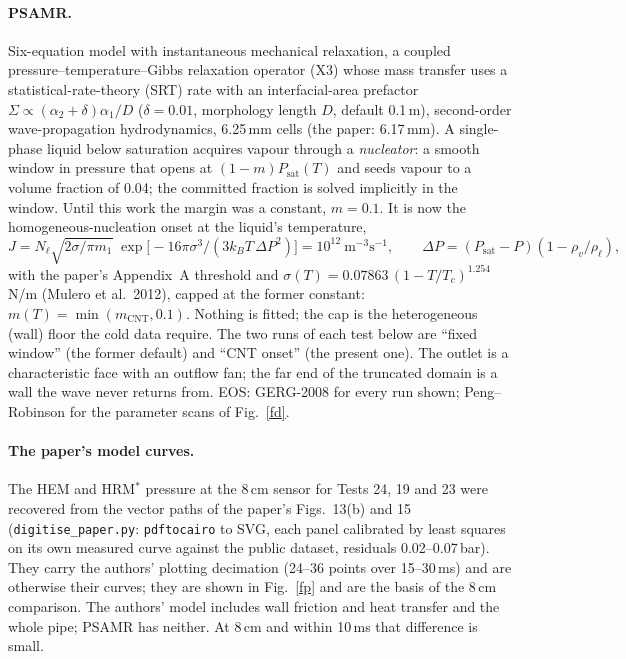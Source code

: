 \documentclass[11pt,a4paper]{article}
\begin{document}
\paragraph{PSAMR.} Six-equation model with instantaneous mechanical relaxation, a coupled pressure--temperature--Gibbs relaxation operator (X3) whose mass transfer uses a statistical-rate-theory (SRT) rate with an interfacial-area prefactor $\Sigma \propto (\alpha_2+\delta)\alpha_1/D$ ($\delta = 0.01$, morphology length $D$, default 0.1\,m), second-order wave-propagation hydrodynamics, 6.25\,mm cells (the paper: 6.17\,mm). A single-phase liquid below saturation acquires vapour through a \emph{nucleator}: a smooth window in pressure that opens at $(1 - m)P_{\mathrm{sat}}(T)$ and seeds vapour to a volume fraction of 0.04; the committed fraction is solved implicitly in the window. Until this work the margin was a constant, $m = 0.1$. It is now the homogeneous-nucleation onset at the liquid's temperature,
\[ J = N_\ell\sqrt{2\sigma/\pi m_1}\;\exp\!\big[-16\pi\sigma^3/(3k_BT\,\Delta P^2)\big] = 10^{12}\ \mathrm{m^{-3}s^{-1}},\qquad \Delta P = (P_{\mathrm{sat}} - P)(1 - \rho_v/\rho_\ell), \]
with the paper's Appendix~A threshold and $\sigma(T) = 0.07863\,(1 - T/T_c)^{1.254}$\,N/m (Mulero et al.\ 2012), capped at the former constant: $m(T) = \min(m_{\mathrm{CNT}}, 0.1)$. Nothing is fitted; the cap is the heterogeneous (wall) floor the cold data require. The two runs of each test below are ``fixed window'' (the former default) and ``CNT onset'' (the present one). The outlet is a characteristic face with an outflow fan; the far end of the truncated domain is a wall the wave never returns from. EOS: GERG-2008 for every run shown; Peng--Robinson for the parameter scans of Fig.~\ref{fd}.

\paragraph{The paper's model curves.} The HEM and HRM$^*$ pressure at the 8\,cm sensor for Tests 24, 19 and 23 were recovered from the vector paths of the paper's Figs.~13(b) and 15 (\texttt{digitise\_paper.py}: \texttt{pdftocairo} to SVG, each panel calibrated by least squares on its own measured curve against the public dataset, residuals 0.02--0.07\,bar). They carry the authors' plotting decimation (24--36 points over 15--30\,ms) and are otherwise their curves; they are shown in Fig.~\ref{fp} and are the basis of the 8\,cm comparison. The authors' model includes wall friction and heat transfer and the whole pipe; PSAMR has neither. At 8\,cm and within 10\,ms that difference is small.
\end{document}
